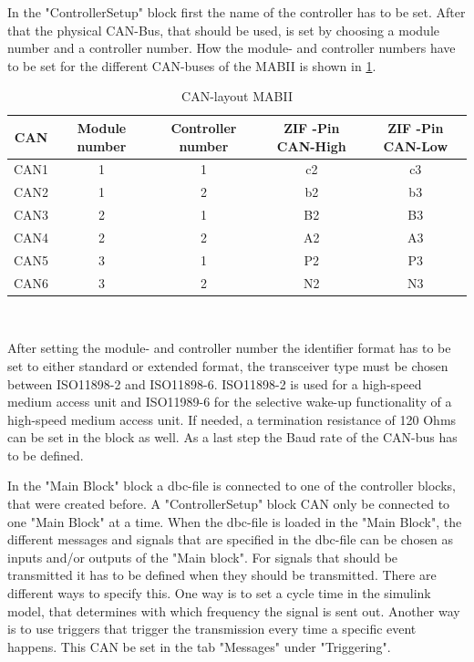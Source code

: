 \documentclass[ExampleMasters.tex]{subfiles}
\begin{document}
In the "ControllerSetup" block first the name of the controller has to be set. After that the physical CAN-Bus, that should be used, is set by choosing a module number and a controller number. How the module- and controller numbers have to be set for the different CAN-buses of the \gls{MABII} is shown in \ref{tab:CAN-layout}.
\begin{table}[h]
	\centering
	\caption{CAN-layout MABII}
	\label{tab:CAN-layout}
	\begin{tabular}{c|c|c|c|c|}
		CAN   & Module number & Controller number & \gls{ZIF} -Pin CAN-High & \gls{ZIF} -Pin \gls{CAN}-Low  \\ \hline
		CAN1     &       1 & 1  & c2 & c3         \\
		CAN2   &      1 & 2  & b2 & b3    \\
		CAN3 &      2 & 1 & B2 & B3        \\
		CAN4& 2 & 2 & A2 & A3  \\
		CAN5& 3 & 1 & P2 & P3 \\
		CAN6& 3 & 2 & N2 & N3 \\
	\end{tabular} \\
\end{table}

After setting the module- and controller number the identifier format has to be set to either standard or extended format, the transceiver type must be chosen between ISO11898-2 and ISO11898-6. ISO11898-2 is used for a high-speed medium access unit and ISO11989-6 for the selective wake-up functionality of a high-speed medium access unit. If needed, a termination resistance of 120 Ohms can be set in the block as well. As a last step the Baud rate of the \gls{CAN}-bus has to be defined.


In the "Main Block" block a dbc-file is connected to one of the controller blocks, that were created before. A "ControllerSetup" block \gls{CAN} only be connected to one "Main Block" at a time. When the dbc-file is loaded in the "Main Block", the different messages and signals that are specified in the dbc-file can be chosen as inputs and/or outputs of the "Main block". For signals that should be transmitted it has to be defined when they should be transmitted. There are different ways to specify this. One way is to set a cycle time in the simulink model, that determines with which frequency the signal is sent out. Another way is to use triggers that trigger the transmission every time a specific event happens. This \gls{CAN} be set in the tab "Messages" under "Triggering".
\end{document}
